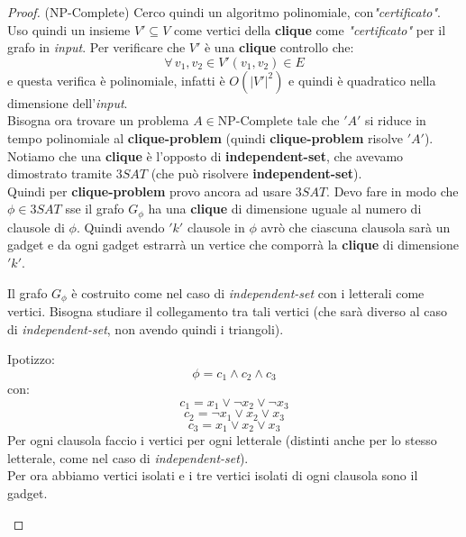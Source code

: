 							\begin{proof}(NP-Complete)
								Cerco
								quindi un algoritmo 
								polinomiale, con\textit{"certificato"}. Uso quindi un insieme $V'\subseteq V$ come
								vertici della \textbf{clique} come \textit{"certificato"} per il grafo in \textit{input}. Per
								verificare che $V'$ è una \textbf{clique} controllo che:
								\[\forall\,v_1,v_2\in    V' (v_1,v_2)\in E\]
								e questa verifica è polinomiale, infatti è $O(|V'|^2)$ e
								quindi è quadratico nella dimensione dell'\textit{input}.\\
								Bisogna ora trovare un problema $A\in \mbox{NP-Complete}$ tale che $ 'A' $ si
								riduce in tempo polinomiale al \textbf{clique-problem} (quindi
								\textbf{clique-problem} risolve $ 'A' $).  \\
								Notiamo che una \textbf{clique} è l'opposto di \textbf{independent-set}, che
								avevamo dimostrato tramite $3SAT$ (che può risolvere
								\textbf{independent-set}).\\
								Quindi per \textbf{clique-problem} provo ancora ad usare $3SAT$. Devo fare in
								modo che $\phi\in 3SAT$ sse il grafo $G_\phi$ ha una \textbf{clique} di
								dimensione uguale al numero di clausole di $\phi$. Quindi avendo $ 'k' $ clausole
								in $\phi$ avrò che ciascuna clausola sarà un gadget e da ogni gadget estrarrà
								un vertice che comporrà la \textbf{clique} di dimensione $ 'k' $.\\
								\begin{nota}
									Il grafo $G_\phi$ è costruito come nel caso di \textit{independent-set} con i
									letterali come vertici.
									Bisogna studiare il collegamento tra tali vertici (che sarà diverso al caso di
									\textit{independent-set}, non avendo quindi i triangoli).\\
								\end{nota}
								Ipotizzo:
								\[\phi=c_1\land c_2\land c_3\]
								con:
								\[c_1=x_1\lor \neg x_2\lor \neg x_3\]
								\[c_2=\neg x_1\lor x_2\lor x_3\]
								\[c_3=x_1\lor x_2\lor x_3\]
								Per ogni clausola faccio i vertici per ogni letterale (distinti anche per lo
								stesso letterale, come nel caso di \textit{independent-set}).\\
								Per ora abbiamo vertici isolati e i tre vertici isolati di ogni clausola sono
								il gadget.
								\begin{figure}[H]
									\centering

\end{figure}
\end{proof}
